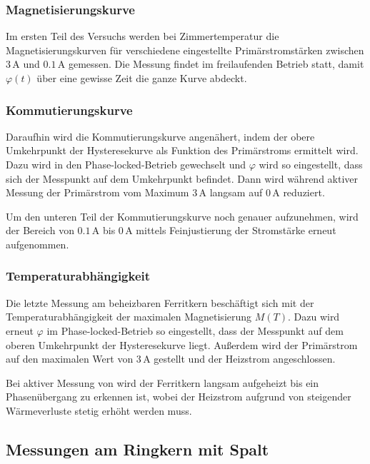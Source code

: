 \documentclass[12pt,a4paper]{scrartcl}
\numberwithin{equation}{section} %
\renewcommand{\[}{} %
\renewcommand{\]}{\noindent} %
\begin{document}
\hypertarget{magnetisierungskurve}{%
\subsubsection{Magnetisierungskurve}\label{magnetisierungskurve}}
Im ersten Teil des Versuchs werden bei Zimmertemperatur die Magnetisierungskurven für verschiedene eingestellte Primärstromstärken zwischen \(3\,\mathrm A\) und \(0.1\,\mathrm A\) gemessen. Die Messung findet im freilaufenden Betrieb statt, damit \(\varphi(t)\) über eine gewisse Zeit die ganze Kurve abdeckt.

\hypertarget{kommutierungskurve}{%
\subsubsection{Kommutierungskurve}\label{kommutierungskurve}}
Daraufhin wird die Kommutierungskurve angenähert, indem der obere Umkehrpunkt der Hysteresekurve als Funktion des Primärstroms ermittelt wird. Dazu wird in den Phase-locked-Betrieb gewechselt und \(\varphi\) wird so eingestellt, dass sich der Messpunkt auf dem Umkehrpunkt befindet. Dann wird während aktiver Messung der Primärstrom vom Maximum \(3\,\mathrm A\) langsam auf \(0\,\mathrm A\) reduziert.

Um den unteren Teil der Kommutierungskurve noch genauer aufzunehmen, wird der Bereich von \(0.1\,\mathrm A\) bis \(0\,\mathrm A\) mittels Feinjustierung der Stromstärke erneut aufgenommen.

\hypertarget{temperaturabhuxe4ngigkeit}{%
\subsubsection{Temperaturabhängigkeit}\label{temperaturabhuxe4ngigkeit}}
Die letzte Messung am beheizbaren Ferritkern beschäftigt sich mit der Temperaturabhängigkeit der maximalen Magnetisierung \(M(T)\). Dazu wird erneut \(\varphi\) im Phase-locked-Betrieb so eingestellt, dass der Messpunkt auf dem oberen Umkehrpunkt der Hysteresekurve liegt. Außerdem wird der Primärstrom auf den maximalen Wert von \(3\,\mathrm A\) gestellt und der Heizstrom angeschlossen.

Bei aktiver Messung von wird der Ferritkern langsam aufgeheizt bis ein Phasenübergang zu erkennen ist, wobei der Heizstrom aufgrund von steigender Wärmeverluste stetig erhöht werden muss.

\hypertarget{messungen-am-ringkern-mit-spalt}{%
\subsection{Messungen am Ringkern mit Spalt}\label{messungen-am-ringkern-mit-spalt}}
\end{document}
